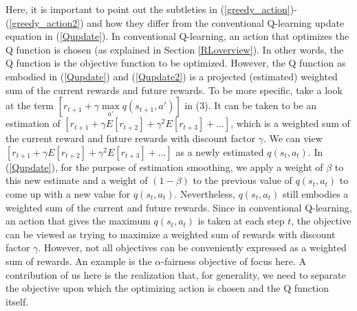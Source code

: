 \documentclass[journal,comsoc]{IEEEtran}
\begin{document}
Here, it is important to point out the subtleties in (\ref{greedy_action})-(\ref{greedy_action2}) and how they differ from the conventional Q-learning update equation in (\ref{Qupdate}). In conventional Q-learning, an action that optimizes the Q function is chosen (as explained in Section \ref{RLoverview}). In other words, the Q function is the objective function to be optimized. However, the Q function as embodied in (\ref{Qupdate}) and (\ref{Qupdate2}) is a projected (estimated) weighted sum of the current rewards and future rewards. To be more specific, take a look at the term $ \left[ {{r_{t + 1}} + \gamma \mathop {\max }\limits_{a'} q\left( {{s_{t + 1}},a'} \right)} \right] $  in (3). It can be taken to be an estimation of   $[{r_{t + 1}} + \gamma E[{r_{t + 2}}] + {\gamma ^2}E[{r_{t + 3}}] + ...]$, which is a weighted sum of the current reward and future rewards with discount factor  $ \gamma $. We can view  $[{r_{t + 1}} + \gamma E[{r_{t + 2}}] + {\gamma ^2}E[{r_{t + 3}}] + ...]$ as a newly estimated  $ q\left( {{s_t},{a_t}} \right) $. In (\ref{Qupdate}), for the purpose of estimation smoothing, we apply a weight of  $ \beta $ to this new estimate and a weight of $(1 - \beta )$  to the previous value of $ q\left( {{s_t},{a_t}} \right) $ to come up with a new value for  $ q\left( {{s_t},{a_t}} \right) $. Nevertheless, $ q\left( {{s_t},{a_t}} \right) $ still embodies a weighted sum of the current and future rewards. Since in conventional Q-learning,  an action  that gives the maximum $ q\left( {{s_t},{a_t}} \right) $ is taken at each step  $ t $, the objective can be viewed as trying to maximize a weighted sum of rewards with discount factor  $ \gamma $. However, not all objectives can be conveniently expressed as a weighted sum of rewards. An example is the  $ \alpha $-fairness objective of focus here. A contribution of us here is the realization that, for generality, we need to separate the objective upon which the optimizing action is chosen and the Q function itself.
\end{document}
